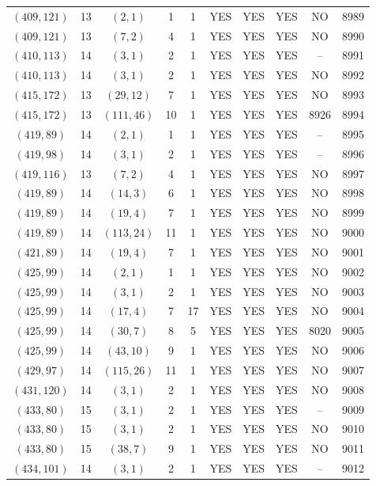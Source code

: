 \begin{longtable}{|c|c|c|c|c|c|c|c|c|c|}
$(409, 121)$ & 13 & $(2, 1)$ & 1 & 1 & YES & YES & YES & NO & 8989\\
$(409, 121)$ & 13 & $(7, 2)$ & 4 & 1 & YES & YES & YES & NO & 8990\\
$(410, 113)$ & 14 & $(3, 1)$ & 2 & 1 & YES & YES & YES & -- & 8991\\
$(410, 113)$ & 14 & $(3, 1)$ & 2 & 1 & YES & YES & YES & NO & 8992\\
$(415, 172)$ & 13 & $(29, 12)$ & 7 & 1 & YES & YES & YES & NO & 8993\\
$(415, 172)$ & 13 & $(111, 46)$ & 10 & 1 & YES & YES & YES & 8926 & 8994\\
$(419, 89)$ & 14 & $(2, 1)$ & 1 & 1 & YES & YES & YES & -- & 8995\\
$(419, 98)$ & 14 & $(3, 1)$ & 2 & 1 & YES & YES & YES & -- & 8996\\
$(419, 116)$ & 13 & $(7, 2)$ & 4 & 1 & YES & YES & YES & NO & 8997\\
$(419, 89)$ & 14 & $(14, 3)$ & 6 & 1 & YES & YES & YES & NO & 8998\\
$(419, 89)$ & 14 & $(19, 4)$ & 7 & 1 & YES & YES & YES & NO & 8999\\
$(419, 89)$ & 14 & $(113, 24)$ & 11 & 1 & YES & YES & YES & NO & 9000\\
$(421, 89)$ & 14 & $(19, 4)$ & 7 & 1 & YES & YES & YES & NO & 9001\\
$(425, 99)$ & 14 & $(2, 1)$ & 1 & 1 & YES & YES & YES & NO & 9002\\
$(425, 99)$ & 14 & $(3, 1)$ & 2 & 1 & YES & YES & YES & NO & 9003\\
$(425, 99)$ & 14 & $(17, 4)$ & 7 & 17 & YES & YES & YES & NO & 9004\\
$(425, 99)$ & 14 & $(30, 7)$ & 8 & 5 & YES & YES & YES & 8020 & 9005\\
$(425, 99)$ & 14 & $(43, 10)$ & 9 & 1 & YES & YES & YES & NO & 9006\\
$(429, 97)$ & 14 & $(115, 26)$ & 11 & 1 & YES & YES & YES & NO & 9007\\
$(431, 120)$ & 14 & $(3, 1)$ & 2 & 1 & YES & YES & YES & NO & 9008\\
$(433, 80)$ & 15 & $(3, 1)$ & 2 & 1 & YES & YES & YES & -- & 9009\\
$(433, 80)$ & 15 & $(3, 1)$ & 2 & 1 & YES & YES & YES & NO & 9010\\
$(433, 80)$ & 15 & $(38, 7)$ & 9 & 1 & YES & YES & YES & NO & 9011\\
$(434, 101)$ & 14 & $(3, 1)$ & 2 & 1 & YES & YES & YES & -- & 9012\\

\end{longtable}

